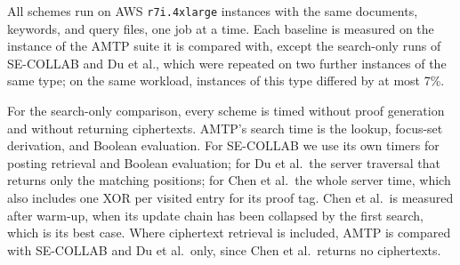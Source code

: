 
All schemes run on AWS \texttt{r7i.4xlarge} instances with the same documents, keywords, and query
files, one job at a time. Each baseline is measured on the instance of the AMTP suite it is compared
with, except the search-only runs of SE-COLLAB and Du et al., which were repeated on two further
instances of the same type; on the same workload, instances of this type differed by at most 7\%.

For the search-only comparison, every scheme is timed without proof generation and without returning
ciphertexts. AMTP's search time is the lookup, focus-set derivation, and Boolean evaluation. For
SE-COLLAB we use its own timers for posting retrieval and Boolean evaluation; for Du et al.\ the server
traversal that returns only the matching positions; for Chen et al.\ the whole server time, which also
includes one XOR per visited entry for its proof tag. Chen et al.\ is measured after warm-up, when its
update chain has been collapsed by the first search, which is its best case. Where ciphertext retrieval
is included, AMTP is compared with SE-COLLAB and Du et al.\ only, since Chen et al.\ returns no
ciphertexts.


